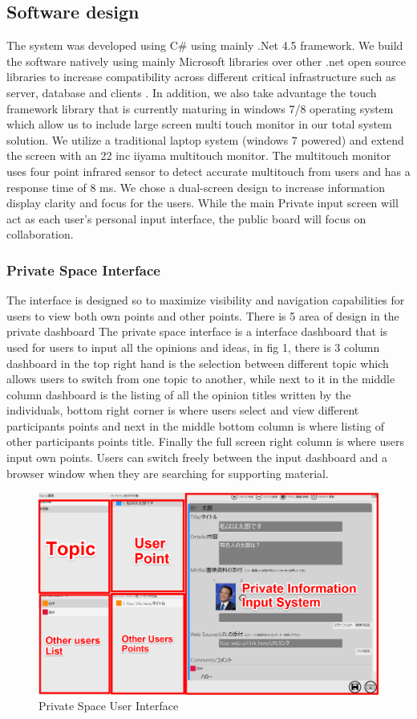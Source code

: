 \documentclass{sigchi}
\begin{document}
\subsection{Software design}


The system was developed using C# using mainly .Net 4.5  framework. We build the software natively using mainly Microsoft libraries over other .net open source libraries to increase compatibility across different critical infrastructure such as server, database and clients . In addition, we also take advantage the touch framework library that is currently maturing in windows 7/8 operating system which allow us to include large screen  multi touch monitor in our  total system solution. We utilize a traditional laptop system (windows 7 powered) and extend the screen with an 22 inc iiyama multitouch monitor. The multitouch monitor uses four point infrared sensor to detect accurate multitouch from users and has a response time of 8 ms.
We chose a dual-screen design to increase information display clarity and focus for the users. While the main Private input screen will act as each user's personal input interface,  the public board will focus on collaboration. 


\subsubsection{Private Space Interface}
The interface  is designed so to maximize visibility and navigation capabilities for users to view both own points and other points. There is 5 area of design in the private dashboard The private space interface is a interface dashboard that is used for users to input all the opinions and ideas, in fig 1, there is 3 column dashboard in the top right hand is the selection between different topic which allows users to switch from one topic to another, while next to it in the middle column dashboard is the listing of all the opinion titles written by the individuals, bottom right corner is where users select and view different participants points and next in the middle bottom column is where listing of other participants points title. Finally the full screen right column is where users input own points. Users can switch freely between the input dashboard and a browser window when they are searching for supporting material.
\begin{figure}
\centering
\includegraphics[width=1.0\columnwidth]{private}
\caption{Private Space User Interface}
\label{fig:figure1}
\end{figure}
\end{document}
